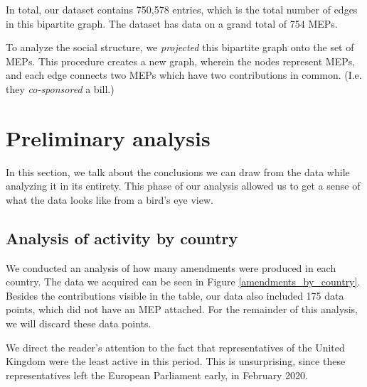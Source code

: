 \documentclass[lettersize,journal]{IEEEtran}
\begin{document}
In total, our dataset contains 750,578 entries, which is the total number of edges in this bipartite graph. The dataset has data on a grand total of 754 MEPs. %

To analyze the social structure, we \textit{projected} this bipartite graph onto the set of MEPs. This procedure creates a new graph, wherein the nodes represent MEPs, and each edge connects two MEPs which have two contributions in common. (I.e. they \textit{co-sponsored} a bill.)


\section{Preliminary analysis}

In this section, we talk about the conclusions we can draw from the data while analyzing it in its entirety. This phase of our analysis allowed us to get a sense of what the data looks like from a bird's eye view.

\subsection{Analysis of activity by country}


We conducted an analysis of how many amendments were produced in each country. The data we acquired can be seen in Figure \ref{amendments_by_country}. Besides the contributions visible in the table, our data also included 175 data points, which did not have an MEP attached. For the remainder of this analysis, we will discard these data points.

We direct the reader's attention to the fact that representatives of the United Kingdom were the least active in this period. This is unsurprising, since these representatives left the European Parliament early, in February 2020.
\end{document}
